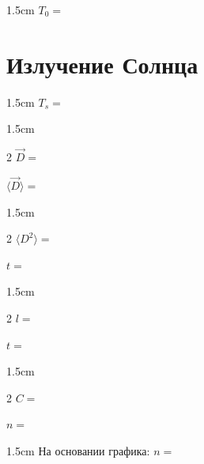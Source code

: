 \begin{answerbox}{1.5cm}
\(T_0=\)
\end{answerbox}

\part{Излучение Солнца}

\begin{answerbox}{1.5cm}
\(T_s=\)
\end{answerbox}

\begin{answerbox}{1.5cm}
\begin{multicols}{2}
\(\vec D=\)

\columnbreak

\(\langle\vec D\rangle=\)
\end{multicols}
\end{answerbox}

\begin{answerbox}{1.5cm}
\begin{multicols}{2}
\(\langle D^2\rangle=\)

\columnbreak

\(t=\)
\end{multicols}
\end{answerbox}

\begin{answerbox}{1.5cm}
\begin{multicols}{2}
\(l=\)

\columnbreak

\(t=\)
\end{multicols}
\end{answerbox}

\begin{answerbox}{1.5cm}
\begin{multicols}{2}
\(C=\)

\columnbreak

\(n=\)
\end{multicols}
\end{answerbox}

\begin{answerbox}{1.5cm}
На основании графика: \(n=\)
\end{answerbox}
